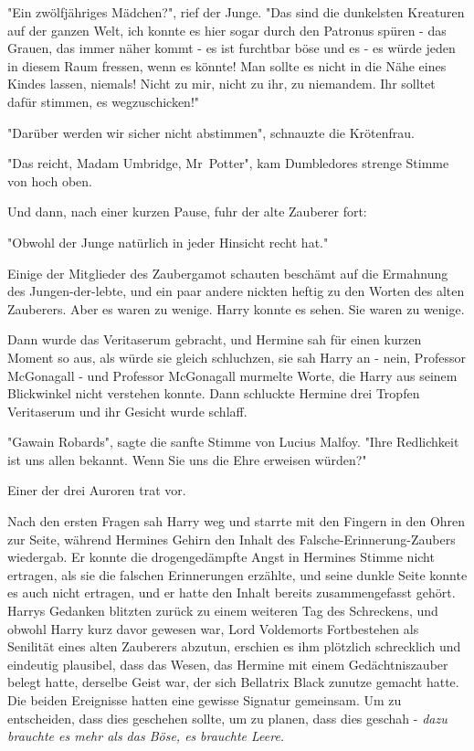 {"Ein zwölfjähriges Mädchen?", rief der Junge. "Das sind die dunkelsten Kreaturen auf der ganzen Welt, ich konnte es hier sogar durch den Patronus spüren - das Grauen, das immer näher kommt - es ist furchtbar böse und es - es würde jeden in diesem Raum fressen, wenn es könnte! Man sollte es nicht in die Nähe eines Kindes lassen, niemals! Nicht zu mir, nicht zu ihr, zu niemandem. Ihr solltet dafür stimmen, es wegzuschicken!"

"Darüber werden wir sicher nicht abstimmen", schnauzte die Krötenfrau.

"Das reicht, Madam Umbridge, Mr~Potter", kam Dumbledores strenge Stimme von hoch oben.

Und dann, nach einer kurzen Pause, fuhr der alte Zauberer fort:

"Obwohl der Junge natürlich in jeder Hinsicht recht hat."

Einige der Mitglieder des Zaubergamot schauten beschämt auf die Ermahnung des Jungen-der-lebte, und ein paar andere nickten heftig zu den Worten des alten Zauberers. Aber es waren zu wenige. Harry konnte es sehen. Sie waren zu wenige.

Dann wurde das Veritaserum gebracht, und Hermine sah für einen kurzen Moment so aus, als würde sie gleich schluchzen, sie sah Harry an - nein, Professor McGonagall - und Professor McGonagall murmelte Worte, die Harry aus seinem Blickwinkel nicht verstehen konnte. Dann schluckte Hermine drei Tropfen Veritaserum und ihr Gesicht wurde schlaff.

"Gawain Robards", sagte die sanfte Stimme von Lucius Malfoy. "Ihre Redlichkeit ist uns allen bekannt. Wenn Sie uns die Ehre erweisen würden?"

Einer der drei Auroren trat vor.

Nach den ersten Fragen sah Harry weg und starrte mit den Fingern in den Ohren zur Seite, während Hermines Gehirn den Inhalt des Falsche-Erinnerung-Zaubers wiedergab. Er konnte die drogengedämpfte Angst in Hermines Stimme nicht ertragen, als sie die falschen Erinnerungen erzählte, und seine dunkle Seite konnte es auch nicht ertragen, und er hatte den Inhalt bereits zusammengefasst gehört. Harrys Gedanken blitzten zurück zu einem weiteren Tag des Schreckens, und obwohl Harry kurz davor gewesen war, Lord Voldemorts Fortbestehen als Senilität eines alten Zauberers abzutun, erschien es ihm plötzlich schrecklich und eindeutig plausibel, dass das Wesen, das Hermine mit einem Gedächtniszauber belegt hatte, derselbe Geist war, der sich Bellatrix Black zunutze gemacht hatte. Die beiden Ereignisse hatten eine gewisse Signatur gemeinsam. Um zu entscheiden, dass dies geschehen sollte, um zu planen, dass dies geschah - \emph{dazu brauchte es mehr als das Böse, es} \emph{brauchte Leere.}

}
